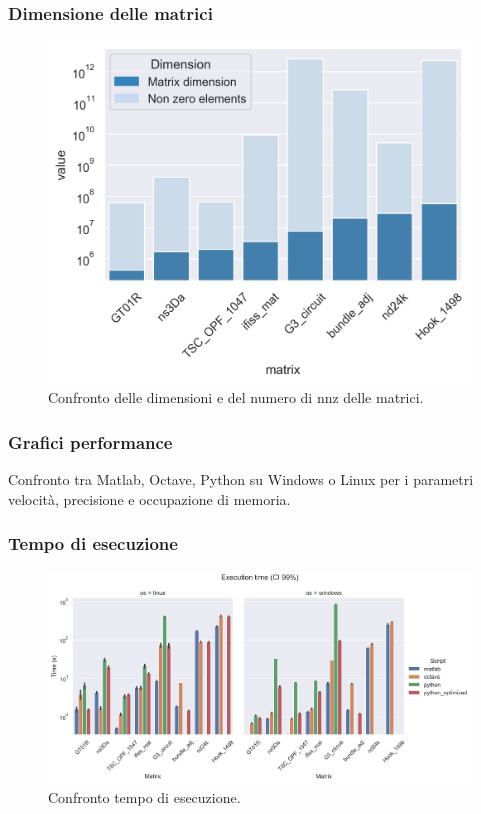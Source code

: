\documentclass{beamer}
\begin{document}
\begin{frame}
	\frametitle{Dimensione delle matrici}
	\begin{figure}
		\includegraphics[width=0.8\textheight]{assets/dimension2.jpg}
		\caption{Confronto delle dimensioni e del numero di nnz delle matrici.}
		\label{fig:dim}
	\end{figure}
\end{frame}

\begin{frame}
\frametitle{Grafici performance}
Confronto tra Matlab,  Octave, Python su Windows o Linux per i parametri velocità, precisione e occupazione di memoria.
\end{frame}


\begin{frame}
	\frametitle{Tempo di esecuzione}
	\begin{figure}
		\includegraphics[width=1.35\textheight]{assets/execution.jpg}
		\caption{Confronto tempo di esecuzione.}
		\label{fig:execution}
	\end{figure}
\end{frame}
\end{document}
